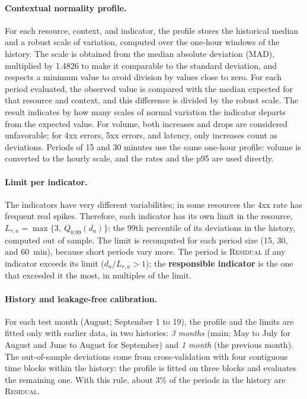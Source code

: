 \documentclass[sigconf,nonacm]{acmart}
\newcommand{\Residual}{\textsc{Residual}\xspace}
\begin{document}
\paragraph{Contextual normality profile.} For each resource, context, and indicator, the profile stores the historical median and a robust scale of variation, computed over the one-hour windows of the history. The scale is obtained from the median absolute deviation (MAD), multiplied by 1.4826 to make it comparable to the standard deviation, and respects a minimum value to avoid division by values close to zero. For each period evaluated, the observed value is compared with the median expected for that resource and context, and this difference is divided by the robust scale. The result indicates by how many scales of normal variation the indicator departs from the expected value. For volume, both increases and drops are considered unfavorable; for 4xx errors, 5xx errors, and latency, only increases count as deviations. Periods of 15 and 30 minutes use the same one-hour profile: volume is converted to the hourly scale, and the rates and the p95 are used directly.

\paragraph{Limit per indicator.} The indicators have very different variabilities; in some resources the 4xx rate has frequent real spikes. Therefore, each indicator has its own limit in the resource, $L_{r,a}=\max\{3,\ Q_{0.99}(d_a)\}$: the 99th percentile of its deviations in the history, computed out of sample. The limit is recomputed for each period size (15, 30, and 60~min), because short periods vary more. The period is \Residual if any indicator exceeds its limit ($d_a/L_{r,a}>1$); the \textbf{responsible indicator} is the one that exceeded it the most, in multiples of the limit.

\paragraph{History and leakage-free calibration.} For each test month (August; September 1 to 19), the profile and the limits are fitted only with earlier data, in two histories: \emph{3 months} (main; May to July for August and June to August for September) and \emph{1 month} (the previous month). The out-of-sample deviations come from cross-validation with four contiguous time blocks within the history: the profile is fitted on three blocks and evaluates the remaining one. With this rule, about 3\% of the periods in the history are \Residual.
\end{document}
